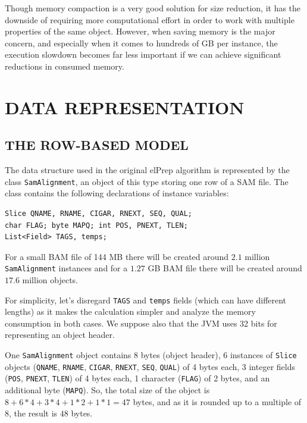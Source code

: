 \documentclass[a4paper,twoside]{article}
\begin{document}
Though memory compaction is a very good solution for size reduction, it has the downside of requiring more computational effort in order to work with multiple properties of the same object.
However, when saving memory is the major concern, and especially when it comes to hundreds of GB per instance, the execution slowdown becomes far less important if we can achieve significant reductions in consumed memory.



\section{\uppercase{Data Representation}}
\label{sec:model}

\subsection{\uppercase{The Row-Based Model}}
\label{subsec:row}

The data structure used in the original elPrep algorithm is represented by the class \texttt{SamAlignment}, an object of this type storing one row of a SAM file.
The class contains the following declarations of instance variables:

\begin{small}
\begin{verbatim}
Slice QNAME, RNAME, CIGAR, RNEXT, SEQ, QUAL; 
char FLAG; byte MAPQ; int POS, PNEXT, TLEN;
List<Field> TAGS, temps;
\end{verbatim}
\end{small}
For a small BAM file of 144 MB there will be created around $2.1$ million \texttt{SamAlignment} instances and for a $1.27$ GB BAM file there will be created around $17.6$ million objects.

For simplicity, let's disregard \texttt{TAGS} and \texttt{temps} fields (which can have different lengths) as it makes the calculation simpler and analyze the memory consumption in both cases.
We suppose also that the JVM uses 32 bits for representing an object header.

One {\texttt{SamAlignment}} object contains
8 bytes (object header), 6 instances of \texttt{Slice} objects (\texttt{QNAME}, \texttt{RNAME}, \texttt{CIGAR}, \texttt{RNEXT}, \texttt{SEQ}, \texttt{QUAL}) of 4 bytes each, 3 integer fields ({\texttt{POS}}, {\texttt{PNEXT}}, {\texttt{TLEN}}) of 4 bytes each, 1 character ({\texttt{FLAG}}) of 2 bytes, and an additional byte ({\texttt{MAPQ}}).
So, the total size of the object is $8 + 6 * 4 + 3*4  + 1 * 2+ 1 * 1 = 47$ bytes, and as it is rounded up to a multiple of $8$, the result is $48$ bytes.
\end{document}
